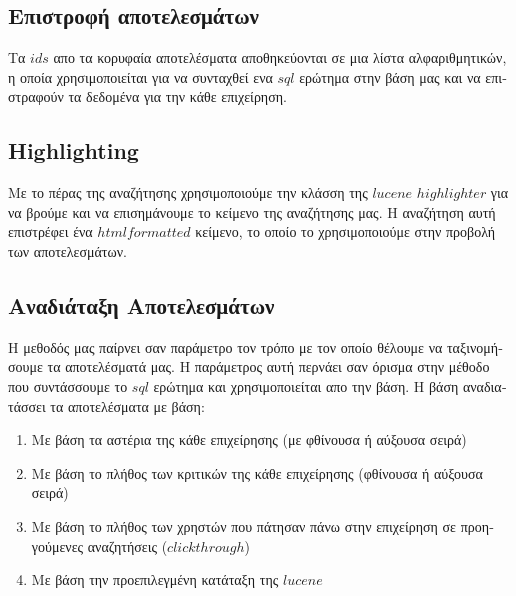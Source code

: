 \subsection{\textgreek{Επιστροφή αποτελεσμάτων}}
\textgreek{
Τα $ids$ απο τα κορυφαία αποτελέσματα αποθηκεύονται σε μια λίστα αλφαριθμητικών, η οποία χρησιμοποιείται για να συνταχθεί
ενα $sql$ ερώτημα στην βάση μας και να επιστραφούν τα δεδομένα για την κάθε επιχείρηση.
}

\subsection{Highlighting}
\textgreek{
Με το πέρας της αναζήτησης χρησιμοποιούμε την κλάσση της $lucene$ $highlighter$ για να βρούμε και να
επισημάνουμε το κείμενο της αναζήτησης μας.
Η αναζήτηση αυτή επιστρέφει ένα $html formatted$ κείμενο, το οποίο το χρησιμοποιούμε στην προβολή των αποτελεσμάτων.
}

\subsection{\textgreek{Αναδιάταξη Αποτελεσμάτων}}
\textgreek{
Η μεθοδός μας παίρνει σαν παράμετρο τον τρόπο με τον οποίο θέλουμε να ταξινομήσουμε τα αποτελέσματά μας.
Η παράμετρος αυτή περνάει σαν όρισμα στην μέθοδο που συντάσσουμε το $sql$ ερώτημα και χρησιμοποιείται απο την βάση.
Η βάση αναδιατάσσει τα αποτελέσματα με βάση:
}
\begin{enumerate}
    \item\textgreek{ Με βάση τα αστέρια της κάθε επιχείρησης (με φθίνουσα ή αύξουσα σειρά)}
    \item\textgreek{ Με βάση το πλήθος των κριτικών της κάθε επιχείρησης (φθίνουσα ή αύξουσα σειρά)}
    \item\textgreek{ Με βάση το πλήθος των χρηστών που πάτησαν πάνω στην επιχείρηση σε προηγούμενες αναζητήσεις ($clickthrough$)}
    \item\textgreek{ Με βάση την προεπιλεγμένη κατάταξη της $lucene$ }
\end{enumerate}